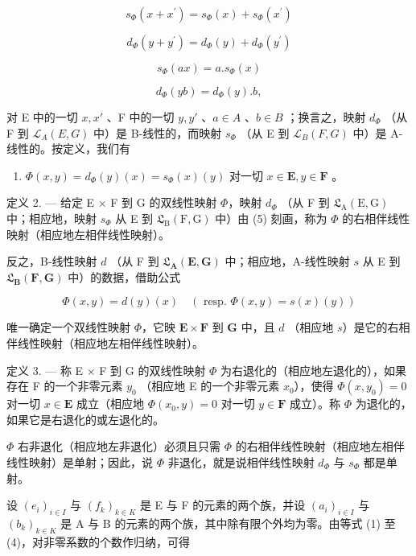 \[
s _ {\Phi} (x + x ^ {\prime}) = s _ {\Phi} (x) + s _ {\Phi} (x ^ {\prime})\tag{1'}
\]

\[
d _ {\Phi} (y + y ^ {\prime}) = d _ {\Phi} (y) + d _ {\Phi} (y ^ {\prime})\tag{2'}
\]

\[
s _ {\Phi} (a x) = a. s _ {\Phi} (x)\tag{3'}
\]

\[
d _ {\Phi} (y b) = d _ {\Phi} (y). b,\tag{4'}
\]

对 E 中的一切 \(x, x'\) 、F 中的一切 \(y, y'\) 、\(a \in A\) 、\(b \in B\) ；换言之，映射 \(d_{\Phi}\) （从 F 到 \(\mathcal{L}_{A}(E, G)\) 中）是 B-线性的，而映射 \(s_{\Phi}\) （从 E 到 \(\mathcal{L}_{B}(F, G)\) 中）是 A-线性的。按定义，我们有

\begin{enumerate}
\def\labelenumi{(\arabic{enumi})}
\setcounter{enumi}{4}
\tightlist
\item
  \(\Phi(x, y) = d_{\Phi}(y)(x) = s_{\Phi}(x)(y)\) 对一切 \(x \in \mathbf{E}, y \in \mathbf{F}\) 。
\end{enumerate}

定义 2. --- 给定 E × F 到 G 的双线性映射 \(\Phi\)，映射 \(d_{\Phi}\) （从 F 到 \(\mathfrak{L}_{\mathrm{A}}(\mathrm{E}, \mathrm{G})\) 中；相应地，映射 \(s_{\Phi}\) 从 E 到 \(\mathfrak{L}_{\mathrm{B}}(\mathrm{F}, \mathrm{G})\) 中）由 (5) 刻画，称为 \(\Phi\) 的右相伴线性映射（相应地左相伴线性映射）。

反之，B-线性映射 \(d\) （从 F 到 \(\mathfrak{L}_{\mathbf{A}}(\mathbf{E},\mathbf{G})\) 中；相应地，A-线性映射 \(s\) 从 E 到 \(\mathfrak{L}_{\mathbf{B}}(\mathbf{F},\mathbf{G})\) 中）的数据，借助公式

\[
\Phi (x, y) = d (y) (x) \quad (\text { resp. } \Phi (x, y) = s (x) (y))
\]

唯一确定一个双线性映射 \(\Phi\)，它映 \(\mathbf{E} \times \mathbf{F}\) 到 \(\mathbf{G}\) 中，且 \(d\) （相应地 \(s\)）是它的右相伴线性映射（相应地左相伴线性映射）。

定义 3. --- 称 E × F 到 G 的双线性映射 \(\Phi\) 为右退化的（相应地左退化的），如果存在 F 的一个非零元素 \(y_0\) （相应地 E 的一个非零元素 \(x_0\)），使得 \(\Phi(x, y_0) = 0\) 对一切 \(x \in \mathbf{E}\) 成立（相应地 \(\Phi(x_0, y) = 0\) 对一切 \(y \in \mathbf{F}\) 成立）。称 \(\Phi\) 为退化的，如果它是右退化的或左退化的。

\(\Phi\) 右非退化（相应地左非退化）必须且只需 \(\Phi\) 的右相伴线性映射（相应地左相伴线性映射）是单射；因此，说 \(\Phi\) 非退化，就是说相伴线性映射 \(d_{\Phi}\) 与 \(s_{\Phi}\) 都是单射。

设 \((e_i)_{i\in I}\) 与 \((f_k)_{k\in K}\) 是 E 与 F 的元素的两个族，并设 \((a_i)_{i\in I}\) 与 \((b_k)_{k\in K}\) 是 A 与 B 的元素的两个族，其中除有限个外均为零。由等式 (1) 至 (4)，对非零系数的个数作归纳，可得

